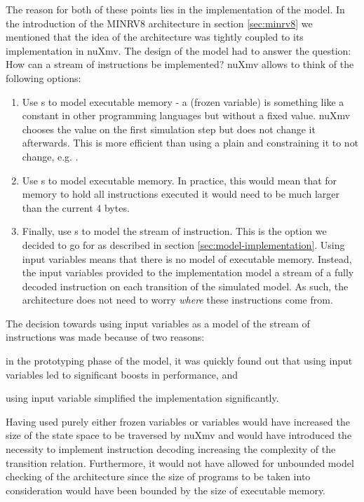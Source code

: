 The reason for both of these points lies in the implementation of the model.
In the introduction of the MINRV8 architecture in section \ref{sec:minrv8} we mentioned that the idea of the architecture was tightly coupled to its implementation in nuXmv.
The design of the model had to answer the question: How can a stream of instructions be implemented?
nuXmv allows to think of the following options:
\begin{enumerate}
    \item \label{itm:exmem-frozen}
    Use s to model executable memory - a  (frozen variable) is something like a constant in other programming languages but without a fixed value.
    nuXmv chooses the value on the first simulation step but does not change it afterwards.
    This is more efficient than using a plain  and constraining it to not change, e.g. .
    \item \label{itm:exmem-var}
    Use s to model executable memory.
    In practice, this would mean that for memory to hold all instructions executed it would need to be much larger than the current 4 bytes.
    \item \label{itm:exmem-ivar}
    Finally, use s to model the stream of instruction.
    This is the option we decided to go for as described in section \ref{sec:model-implementation}.
    Using input variables means that there is no model of executable memory.
    Instead, the input variables provided to the implementation model a stream of a fully decoded instruction on each transition of the simulated model.
    As such, the architecture does not need to worry \textit{where} these instructions come from.
\end{enumerate}

The decision towards using input variables as a model of the stream of instructions was made because of two reasons:
\begin{enumerate*}[label=\alph*)]
    \item in the prototyping phase of the model, it was quickly found out that using input variables led to significant boosts in performance, and
    \item using input variable simplified the implementation significantly.
\end{enumerate*}
Having used purely either frozen variables or variables would have increased the size of the state space to be traversed by nuXmv and would have introduced the necessity to implement instruction decoding increasing the complexity of the transition relation.
Furthermore, it would not have allowed for unbounded model checking of the architecture since the size of programs to be taken into consideration would have been bounded by the size of executable memory.

